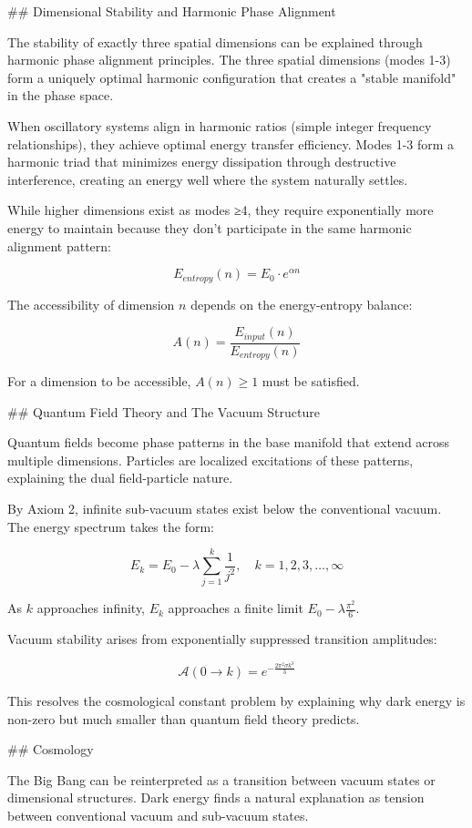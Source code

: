 ## Dimensional Stability and Harmonic Phase Alignment

The stability of exactly three spatial dimensions can be explained through harmonic phase alignment principles. The three spatial dimensions (modes 1-3) form a uniquely optimal harmonic configuration that creates a "stable manifold" in the phase space.

When oscillatory systems align in harmonic ratios (simple integer frequency relationships), they achieve optimal energy transfer efficiency. Modes 1-3 form a harmonic triad that minimizes energy dissipation through destructive interference, creating an energy well where the system naturally settles.

While higher dimensions exist as modes ≥4, they require exponentially more energy to maintain because they don't participate in the same harmonic alignment pattern:

$$E_{entropy}(n) = E_0 \cdot e^{\alpha n}$$

The accessibility of dimension $n$ depends on the energy-entropy balance:

$$A(n) = \frac{E_{input}(n)}{E_{entropy}(n)}$$

For a dimension to be accessible, $A(n) \geq 1$ must be satisfied.

## Quantum Field Theory and The Vacuum Structure

Quantum fields become phase patterns in the base manifold that extend across multiple dimensions. Particles are localized excitations of these patterns, explaining the dual field-particle nature.

By Axiom 2, infinite sub-vacuum states exist below the conventional vacuum. The energy spectrum takes the form:

$$E_k = E_0 - \lambda\sum_{j=1}^{k}\frac{1}{j^2}, \quad k = 1, 2, 3, \ldots, \infty$$

As $k$ approaches infinity, $E_k$ approaches a finite limit $E_0 - \lambda\frac{\pi^2}{6}$.

Vacuum stability arises from exponentially suppressed transition amplitudes:

$$\mathcal{A}(0 \rightarrow k) = e^{-\frac{2\pi^2\sigma k^3}{3}}$$

This resolves the cosmological constant problem by explaining why dark energy is non-zero but much smaller than quantum field theory predicts.

## Cosmology

The Big Bang can be reinterpreted as a transition between vacuum states or dimensional structures. Dark energy finds a natural explanation as tension between conventional vacuum and sub-vacuum states.

